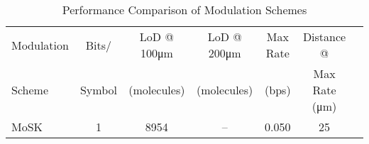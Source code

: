 \begin{table}[h]
\centering
\caption{Performance Comparison of Modulation Schemes}
\label{tab:performance}
\begin{tabular}{lcccccr}
\toprule
Modulation & Bits/ & LoD @ 100μm & LoD @ 200μm & Max Rate & Distance @ \\
Scheme & Symbol & (molecules) & (molecules) & (bps) & Max Rate (μm) \\
\midrule
MoSK & 1 & 8954 & -- & 0.050 & 25 & \bottomrule
\end{tabular}
\end{table}
